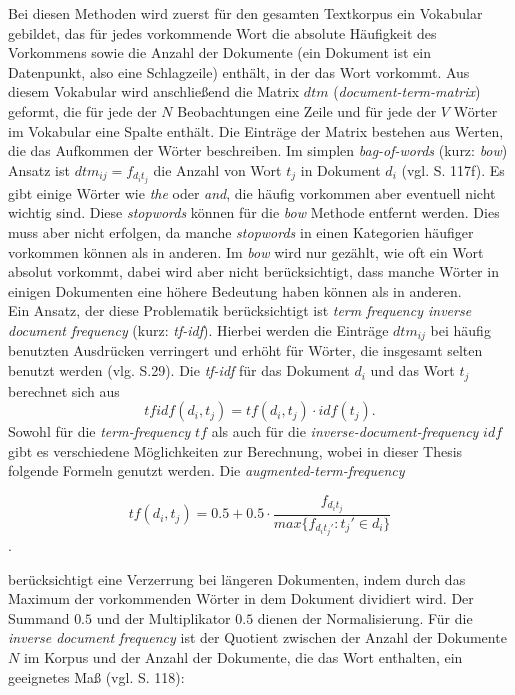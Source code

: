 \documentclass[a4paper,11pt]{article}
\begin{document}
Bei diesen Methoden wird zuerst für den gesamten Textkorpus ein Vokabular gebildet, das für jedes vorkommende Wort die absolute Häufigkeit des Vorkommens sowie die Anzahl der Dokumente (ein Dokument ist ein Datenpunkt, also eine Schlagzeile) enthält, in der das Wort vorkommt. Aus diesem Vokabular wird anschließend die Matrix $dtm$ (\textit{document-term-matrix}) geformt, die für jede der $N$ Beobachtungen eine Zeile und für jede der $V$ Wörter im Vokabular eine Spalte enthält. Die Einträge der Matrix bestehen aus Werten, die das Aufkommen der Wörter beschreiben. Im simplen \textit{bag-of-words} (kurz: \textit{bow}) Ansatz ist $dtm_{ij} = f_{d_i t_j}$ die Anzahl von Wort $t_j$ in Dokument $d_i$ (vgl. \cite{deepEssentials} S. 117f). Es gibt einige Wörter wie \textit{the} oder \textit{and}, die häufig vorkommen aber eventuell nicht wichtig sind. Diese \textit{stopwords} können für die \textit{bow} Methode entfernt werden. Dies muss aber nicht erfolgen, da manche \textit{stopwords} in einen Kategorien häufiger vorkommen können als in anderen.
Im \textit{bow} wird nur gezählt, wie oft ein Wort absolut vorkommt, dabei wird aber nicht berücksichtigt, dass manche Wörter in einigen Dokumenten eine höhere Bedeutung haben können als in anderen. \\

Ein Ansatz, der diese Problematik berücksichtigt ist \textit{term frequency inverse document frequency} (kurz: \textit{tf-idf}). Hierbei werden die Einträge $dtm_{ij}$ bei häufig benutzten Ausdrücken verringert und erhöht für Wörter, die insgesamt selten benutzt werden (vlg. \cite{textMiningR} S.29). Die \textit{tf-idf} für das Dokument $d_i$ und das Wort $t_j$ berechnet sich aus 
\[tfidf(d_i, t_j) = tf(d_i,t_j) \cdot idf(t_j) . \]
Sowohl für die \textit{term-frequency} $tf$ als auch für die \textit{inverse-document-frequency} $idf$ gibt es verschiedene Möglichkeiten zur Berechnung, wobei in dieser Thesis folgende Formeln genutzt werden.
Die \textit{augmented-term-frequency}

\[tf(d_i,t_j) = 0.5 +  0.5 \cdot \frac{f_{d_i t_j}}{max \{ f_{d_i t_j'}: t_j' \in d_i \}} \].

berücksichtigt eine Verzerrung bei längeren Dokumenten, indem durch das Maximum der vorkommenden Wörter in dem Dokument dividiert wird. Der Summand $0.5$ und der Multiplikator $0.5$ dienen der Normalisierung. Für die \textit{inverse document frequency} ist der Quotient zwischen der Anzahl der Dokumente $N$ im Korpus und der Anzahl der Dokumente, die das Wort enthalten, ein geeignetes Maß (vgl. \cite{deepEssentials} S. 118):
\end{document}
